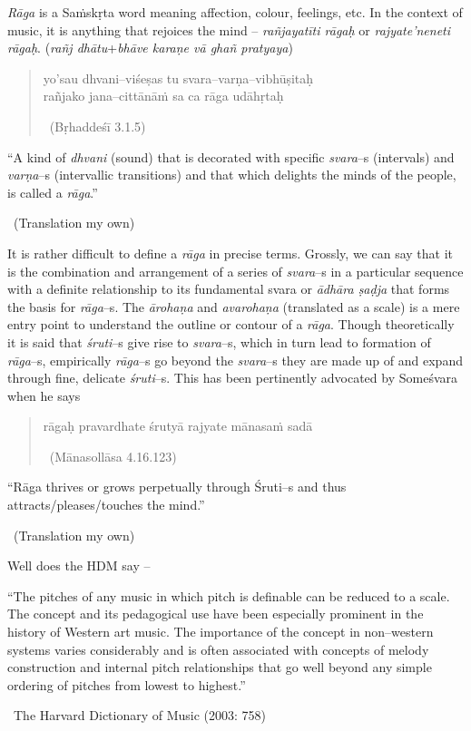 \textit{Rāga} is a Saṁskṛta word meaning affection, colour, feelings, etc. In the context of music, it is anything that rejoices the mind – \textit{rañjayatīti rāgaḥ} or \textit{rajyate’neneti rāgaḥ}. (\textit{rañj dhātu}+\textit{bhāve karaṇe vā ghañ pratyaya})

\begin{verse}
yo’sau dhvani–viśeṣas tu svara–varṇa–vibhūṣitaḥ \\ rañjako jana–cittānāṁ sa ca rāga udāhṛtaḥ  

~\hfill (Bṛhaddeśī 3.1.5)
\end{verse}

\begin{myquote}
“A kind of \textit{dhvani} (sound) that is decorated with specific \textit{svara}–s (intervals) and \textit{varṇa}–s (intervallic transitions) and that which delights the minds of the people, is called a \textit{rāga}.” 

~\hfill (Translation my own)
\end{myquote}

It is rather difficult to define a \textit{rāga} in precise terms. Grossly, we can say that it is the combination and arrangement of a series of \textit{svara}–s in a particular sequence with a definite relationship to its fundamental svara or \textit{ādhāra ṣaḍja} that forms the basis for \textit{rāga}–s. The \textit{ārohaṇa} and \textit{avarohaṇa} (translated as a scale) is a mere entry point to understand the outline or contour of a \textit{rāga}. Though theoretically it is said that \textit{śruti}–s give rise to \textit{svara}–s, which in turn lead to formation of \textit{rāga}–s, empirically \textit{rāga}–s go beyond the \textit{svara}–s they are made up of and expand through fine, delicate \textit{śruti}–s. This has been pertinently advocated by Someśvara when he says

\begin{verse}
rāgaḥ pravardhate śrutyā rajyate mānasaṁ sadā 

~\hfill (Mānasollāsa 4.16.123)
\end{verse}

\begin{myquote}
“Rāga thrives or grows perpetually through Śruti–s and thus attracts/\break pleases/touches the mind.” 

~\hfill (Translation my own)
\end{myquote}

Well does the HDM say –

\begin{myquote}
“The pitches of any music in which pitch is definable can be reduced to a scale. The concept and its pedagogical use have been especially prominent in the history of Western art music. The importance of the concept in non–western systems varies considerably and is often associated with concepts of melody construction and internal pitch relationships that go well beyond any simple ordering of pitches from lowest to highest.” 

~\hfill The Harvard Dictionary of Music (2003: 758)
\end{myquote}

